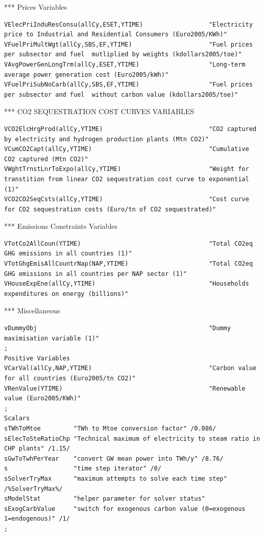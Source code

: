 \documentclass[a4paper,]{scrartcl}
\begin{document}
*** Prices Variables

\begin{lstlisting}
VElecPriInduResConsu(allCy,ESET,YTIME)                  "Electricity price to Industrial and Residential Consumers (Euro2005/KWh)"
VFuelPriMultWgt(allCy,SBS,EF,YTIME)                     "Fuel prices per subsector and fuel  mutliplied by weights (kdollars2005/toe)"  
VAvgPowerGenLongTrm(allCy,ESET,YTIME)                   "Long-term average power generation cost (Euro2005/kWh)"     
VFuelPriSubNoCarb(allCy,SBS,EF,YTIME)                   "Fuel prices per subsector and fuel  without carbon value (kdollars2005/toe)"   
\end{lstlisting}

*** CO2 SEQUESTRATION COST CURVES VARIABLES

\begin{lstlisting}
VCO2ElcHrgProd(allCy,YTIME)                             "CO2 captured by electricity and hydrogen production plants (Mtn CO2)"
VCumCO2Capt(allCy,YTIME)                                "Cumulative CO2 captured (Mtn CO2)"     
VWghtTrnstLnrToExpo(allCy,YTIME)                        "Weight for transtition from linear CO2 sequestration cost curve to exponential (1)"
VCO2CO2SeqCsts(allCy,YTIME)                             "Cost curve for CO2 sequestration costs (Euro/tn of CO2 sequestrated)"
\end{lstlisting}

*** Emissions Constraints Variables

\begin{lstlisting}
VTotCo2AllCoun(YTIME)                                   "Total CO2eq GHG emissions in all countries (1)"
VTotGhgEmisAllCountrNap(NAP,YTIME)                      "Total CO2eq GHG emissions in all countries per NAP sector (1)" 
VHouseExpEne(allCy,YTIME)                               "Households expenditures on energy (billions)"
\end{lstlisting}

*** Miscellaneous

\begin{lstlisting}
vDummyObj                                               "Dummy maximisation variable (1)"
;
Positive Variables
VCarVal(allCy,NAP,YTIME)                                "Carbon value for all countries (Euro2005/tn CO2)"
VRenValue(YTIME)                                        "Renewable value (Euro2005/KWh)"
;
Scalars
sTWhToMtoe         "TWh to Mtoe conversion factor" /0.086/
sElecToSteRatioChp "Technical maximum of electricity to steam ratio in CHP plants" /1.15/
sGwToTwhPerYear    "convert GW mean power into TWh/y" /8.76/
s                  "time step iterator" /0/
sSolverTryMax      "maximum attempts to solve each time step" /%SolverTryMax%/
sModelStat         "helper parameter for solver status"
sExogCarbValue     "switch for exogenous carbon value (0=exogenous 1=endogenous)" /1/
;
\end{lstlisting}
\end{document}

